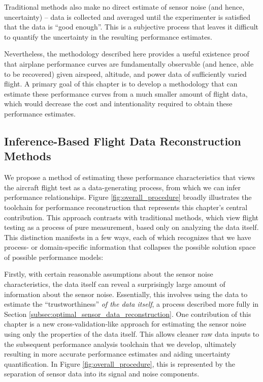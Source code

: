 Traditional methods also make no direct estimate of sensor noise (and hence, uncertainty) -- data is collected and averaged until the experimenter is satisfied that the data is ``good enough''. This is a subjective process that leaves it difficult to quantify the uncertainty in the resulting performance estimates.

Nevertheless, the methodology described here provides a useful existence proof that airplane performance curves are fundamentally observable (and hence, able to be recovered) given airspeed, altitude, and power data of sufficiently varied flight. A primary goal of this chapter is to develop a methodology that can estimate these performance curves from a much smaller amount of flight data, which would decrease the cost and intentionality required to obtain these performance estimates.

\subsection{Inference-Based Flight Data Reconstruction Methods}

We propose a method of estimating these performance characteristics that views the aircraft flight test as a data-generating process, from which we can infer performance relationships. Figure \ref{fig:overall_procedure} broadly illustrates the toolchain for performance reconstruction that represents this chapter's central contribution. This approach contrasts with traditional methods, which view flight testing as a process of pure measurement, based only on analyzing the data itself. This distinction manifests in a few ways, each of which recognizes that we have process- or domain-specific information that collapses the possible solution space of possible performance models:

Firstly, with certain reasonable assumptions about the sensor noise characteristics, the data itself can reveal a surprisingly large amount of information about the sensor noise. Essentially, this involves using the data to estimate the ``trustworthiness'' \emph{of the data itself}, a process described more fully in Section \ref{subsec:optimal_sensor_data_reconstruction}. One contribution of this chapter is a new cross-validation-like approach for estimating the sensor noise using only the properties of the data itself. This allows cleaner raw data inputs to the subsequent performance analysis toolchain that we develop, ultimately resulting in more accurate performance estimates and aiding uncertainty quantification. In Figure \ref{fig:overall_procedure}, this is represented by the separation of sensor data into its signal and noise components.

